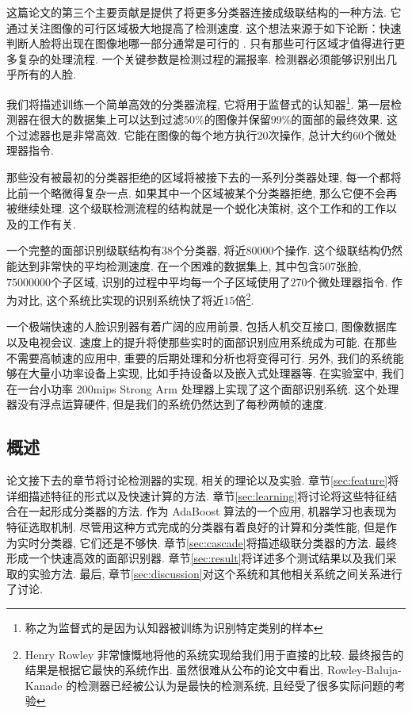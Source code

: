 \documentclass[a4paper,utf8,11pt, onecolumn]{ctexart}
\begin{document}
这篇论文的第三个主要贡献是提供了将更多分类器连接成级联结构的一种方法. 它通过关注图像的可行区域极大地提高了检测速度. 这个想法来源于如下论断：快速判断人脸将出现在图像地哪一部分通常是可行的
\citep{tsotsos1995modeling,itti1998model,amit1999computational,fleuret2001coarse}. 
只有那些可行区域才值得进行更多复杂的处理流程. 一个关键参数是检测过程的漏报率. 检测器必须能够识别出几乎所有的人脸. 

我们将描述训练一个简单高效的分类器流程, 它将用于监督式的认知器\footnote{称之为监督式的是因为认知器被训练为识别特定类别的样本}. 第一层检测器在很大的数据集上可以达到过滤$50\%$的图像并保留$99\%$的面部的最终效果. 
这个过滤器也是非常高效. 它能在图像的每个地方执行$20$次操作, 总计大约$60$个微处理器指令. 

那些没有被最初的分类器拒绝的区域将被接下去的一系列分类器处理, 每一个都将比前一个略微得复杂一点. 如果其中一个区域被某个分类器拒绝, 那么它便不会再被继续处理. 这个级联检测流程的结构就是一个蜕化决策树, 这个工作和\citet{fleuret2001coarse}的工作以及\citet{amit1999computational}的工作有关. 

一个完整的面部识别级联结构有$38$个分类器, 将近$80000$个操作. 这个级联结构仍然能达到非常快的平均检测速度. 在一个困难的数据集上, 其中包含$507$张脸, $75000000$个子区域, 识别的过程中平均每一个子区域使用了$270$个微处理器指令. 作为对比, 这个系统比\citet{rowley1998neural}实现的识别系统快了将近$15$倍\footnote{Henry Rowley 非常慷慨地将他的系统实现给我们用于直接的比较. 最终报告的结果是根据它最快的系统作出. 虽然很难从公布的论文中看出, Rowley-Baluja-Kanade 的检测器已经被公认为是最快的检测系统, 且经受了很多实际问题的考验}. 

一个极端快速的人脸识别器有着广阔的应用前景, 包括人机交互接口, 图像数据库以及电视会议. 速度上的提升将使那些实时的面部识别应用系统成为可能. 在那些不需要高帧速的应用中, 重要的后期处理和分析也将变得可行. 
另外, 我们的系统能够在大量小功率设备上实现, 比如手持设备以及嵌入式处理器等. 在实验室中, 我们在一台小功率 200mips Strong Arm 处理器上实现了这个面部识别系统. 这个处理器没有浮点运算硬件, 但是我们的系统仍然达到了每秒两帧的速度. 
\subsection{概述}
论文接下去的章节将讨论检测器的实现, 相关的理论以及实验. 
章节\ref{sec:feature}将详细描述特征的形式以及快速计算的方法. 章节\ref{sec:learning}将讨论将这些特征结合在一起形成分类器的方法. 作为 AdaBoost 算法的一个应用, 机器学习也表现为特征选取机制. 尽管用这种方式完成的分类器有着良好的计算和分类性能, 但是作为实时分类器, 它们还是不够快. 
章节\ref{sec:cascade}将描述级联分类器的方法. 最终形成一个快速高效的面部识别器. 章节\ref{sec:result}将详述多个测试结果以及我们采取的实验方法. 最后, 章节\ref{sec:discussion}对这个系统和其他相关系统之间关系进行了讨论. 
\end{document}
